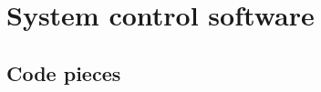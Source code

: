 
\chapter{System control software} %

\label{AppendixA} %

\section{Code pieces}

\lipsum[1-2]

\vspace{10pt}



